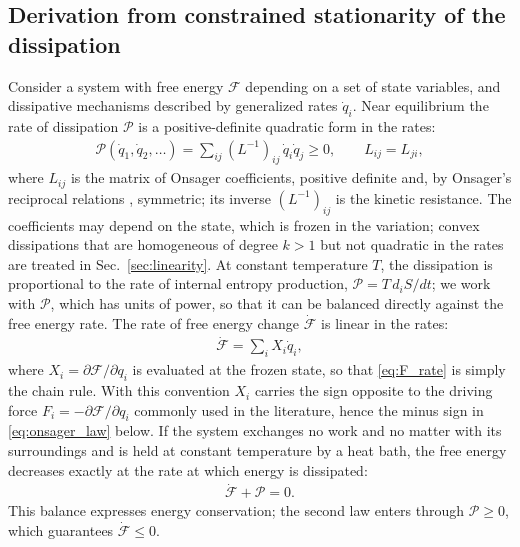 \documentclass[aip,pof,reprint,amsmath,amssymb,longbibliography]{revtex4-2}
\begin{document}
\subsection{Derivation from constrained stationarity of the dissipation}
\label{sec:derivation}

Consider a system with free energy $\mathcal{F}$ depending on a set of state variables, and dissipative mechanisms described by generalized rates $\dot{q}_i$. Near equilibrium the rate of dissipation $\mathcal{P}$ is a positive-definite quadratic form in the rates:
\begin{align}
    \mathcal{P}(\dot{q}_1, \dot{q}_2, \ldots) = \sum_{ij} (L^{-1})_{ij}\, \dot{q}_i \dot{q}_j \geq 0, \qquad L_{ij} = L_{ji}, \label{eq:entropy_prod}
\end{align}
where $L_{ij}$ is the matrix of Onsager coefficients, positive definite and, by Onsager's reciprocal relations \cite{onsager1931reciprocal}, symmetric; its inverse $(L^{-1})_{ij}$ is the kinetic resistance. The coefficients may depend on the state, which is frozen in the variation; convex dissipations that are homogeneous of degree $k > 1$ but not quadratic in the rates are treated in Sec.~\ref{sec:linearity}. At constant temperature $T$, the dissipation is proportional to the rate of internal entropy production, $\mathcal{P} = T\, d_i S/dt$; we work with $\mathcal{P}$, which has units of power, so that it can be balanced directly against the free energy rate. The rate of free energy change $\dot{\mathcal{F}}$ is linear in the rates:
\begin{align}
    \dot{\mathcal{F}} = \sum_i X_i \dot{q}_i, \label{eq:F_rate}
\end{align}
where $X_i = \partial \mathcal{F} / \partial q_i$ is evaluated at the frozen state, so that \eqref{eq:F_rate} is simply the chain rule. With this convention $X_i$ carries the sign opposite to the driving force $F_i = -\partial\mathcal{F}/\partial q_i$ commonly used in the literature, hence the minus sign in \eqref{eq:onsager_law} below. If the system exchanges no work and no matter with its surroundings and is held at constant temperature by a heat bath, the free energy decreases exactly at the rate at which energy is dissipated:
\begin{align}
    \dot{\mathcal{F}} + \mathcal{P} = 0. \label{eq:energy_balance}
\end{align}
This balance expresses energy conservation; the second law enters through $\mathcal{P} \geq 0$, which guarantees $\dot{\mathcal{F}} \leq 0$.
\end{document}
